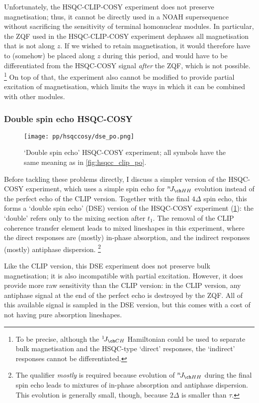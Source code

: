 Unfortunately, the HSQC-CLIP-COSY experiment does not preserve  magnetisation; thus, it cannot be directly used in a NOAH supersequence without sacrificing the sensitivity of terminal homonuclear modules.
In particular, the ZQF used in the HSQC-CLIP-COSY experiment dephases all magnetisation that is not along $z$.
If we wished to retain  magnetisation, it would therefore have to (somehow) be placed along $z$ during this period, and would have to be differentiated from the HSQC-COSY signal \textit{after} the ZQF, which is not possible.%
\footnote{To be precise, although the $\oneJ{CH}$ Hamiltonian could be used to separate bulk magnetisation and the HSQC-type `direct' responses, the `indirect' responses cannot be differentiated.}
On top of that, the experiment also cannot be modified to provide partial excitation of  magnetisation, which limits the ways in which it can be combined with other \carbon{} modules.


\subsubsection{Double spin echo HSQC-COSY}

\begin{figure}[!ht]
    \centering
    \texttt{[image: pp/hsqccosy/dse\_po.png]}%
    \caption[Double spin echo HSQC-COSY experiment]{
        `Double spin echo' HSQC-COSY experiment; all symbols have the same meaning as in \cref{fig:hsqcc_clip_po}.
    }
    \label{fig:hsqcc_dse_po}
\end{figure}

Before tackling these problems directly, I discuss a simpler version of the HSQC-COSY experiment, which uses a simple spin echo for $\nJ{HH}$ evolution instead of the perfect echo of the CLIP version.
Together with the final $4\Delta$ spin echo, this forms a `double spin echo' (DSE) version of the HSQC-COSY experiment (\cref{fig:hsqcc_dse_po}): the `double' refers only to the mixing section after $t_1$.
The removal of the CLIP coherence transfer element leads to mixed lineshapes in this experiment, where the direct responses are (mostly) in-phase absorption, and the indirect responses (mostly) antiphase dispersion.%
\footnote{The qualifier \textit{mostly} is required because evolution of $\nJ{HH}$ during the final spin echo leads to mixtures of in-phase absorption and antiphase dispersion. This evolution is generally small, though, because $2\Delta$ is smaller than $\tau$.}

Like the CLIP version, this DSE experiment does not preserve bulk magnetisation; it is also incompatible with partial  excitation.
However, it does provide more raw sensitivity than the CLIP version: in the CLIP version, any antiphase signal at the end of the perfect echo is destroyed by the ZQF.
All of this available signal is sampled in the DSE version, but this comes with a cost of not having pure absorption lineshapes.

